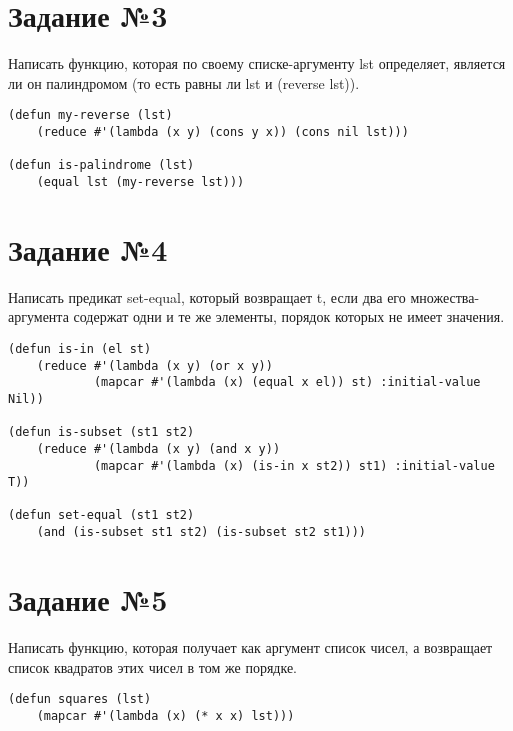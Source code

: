 \section{Задание №3}

Написать функцию, которая по своему списке-аргументу lst определяет, является
ли он палиндромом (то есть равны ли lst и (reverse lst)).

\vspace{4mm}
\begin{minipage}{0.92\linewidth}
\begin{lstlisting}
(defun my-reverse (lst)
    (reduce #'(lambda (x y) (cons y x)) (cons nil lst)))

(defun is-palindrome (lst)
    (equal lst (my-reverse lst)))
\end{lstlisting}
\end{minipage}

\section{Задание №4}

Написать предикат set-equal, который возвращает t, если два его
множества-аргумента содержат одни и те же элементы, порядок которых не имеет
значения.

\vspace{4mm}
\begin{minipage}{0.92\linewidth}
\begin{lstlisting}
(defun is-in (el st)
    (reduce #'(lambda (x y) (or x y))
            (mapcar #'(lambda (x) (equal x el)) st) :initial-value Nil))

(defun is-subset (st1 st2)
    (reduce #'(lambda (x y) (and x y))
            (mapcar #'(lambda (x) (is-in x st2)) st1) :initial-value T))

(defun set-equal (st1 st2)
    (and (is-subset st1 st2) (is-subset st2 st1)))
\end{lstlisting}
\end{minipage}

\section{Задание №5}

Написать функцию, которая получает как аргумент список чисел, а возвращает
список квадратов этих чисел в том же порядке.

\vspace{4mm}
\begin{minipage}{0.92\linewidth}
\begin{lstlisting}
(defun squares (lst)
    (mapcar #'(lambda (x) (* x x) lst)))
\end{lstlisting}
\end{minipage}

